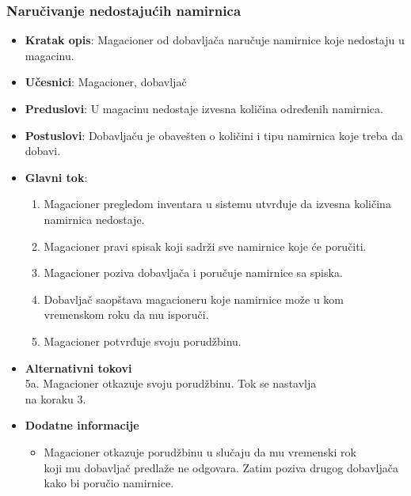  
 
 
 
 
 \subsubsection{Naručivanje nedostajućih namirnica}
 \begin{itemize}
    \item \textbf{Kratak opis}:
   Magacioner od dobavljača naručuje namirnice koje nedostaju u magacinu.
    \item \textbf{Učesnici}:
    Magacioner, dobavljač
    \item \textbf{Preduslovi}:
    U magacinu nedostaje izvesna količina određenih namirnica.
    \item \textbf{Postuslovi}:
    Dobavljaču je obavešten o količini i tipu namirnica koje treba da dobavi. 
    \item \textbf{Glavni tok}:
    \begin{enumerate}
        \item Magacioner pregledom inventara u sistemu utvrđuje da izvesna količina namirnica nedostaje.
        \item Magacioner pravi spisak koji sadrži sve namirnice koje će poručiti.
        \item Magacioner poziva dobavljača i poručuje namirnice sa spiska.
        \item Dobavljač saopštava magacioneru koje namirnice može u kom vremenskom roku da mu isporuči.
        \item Magacioner potvrđuje svoju porudžbinu.
    \end{enumerate}
\item \textbf{Alternativni tokovi}\\
        5a. Magacioner otkazuje svoju porudžbinu. Tok se nastavlja\\ na koraku 3.
 
 \item \textbf{Dodatne informacije}
 \begin{itemize}
     \item 
    Magacioner otkazuje porudžbinu u slučaju da mu vremenski rok\\ koji mu dobavljač predlaže ne odgovara. Zatim poziva drugog dobavljača kako bi poručio namirnice.

 \end{itemize}
 \end{itemize}
 
